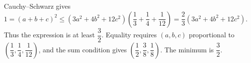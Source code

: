 Cauchy--Schwarz gives $1=(a+b+c)^2\le(3a^2+4b^2+12c^2)\left(\dfrac{1}{3}+\dfrac{1}{4}+\dfrac{1}{12}\right)=\dfrac{2}{3}(3a^2+4b^2+12c^2)$. Thus the expression is at least $\dfrac{3}{2}$. Equality requires $(a,b,c)$ proportional to $(\dfrac{1}{3} , \dfrac{1}{4} , \dfrac{1}{12})$, and the sum condition gives $(\dfrac{1}{2} , \dfrac{3}{8} , \dfrac{1}{8})$. The minimum is $\boxed{\dfrac{3}{2}}$.
